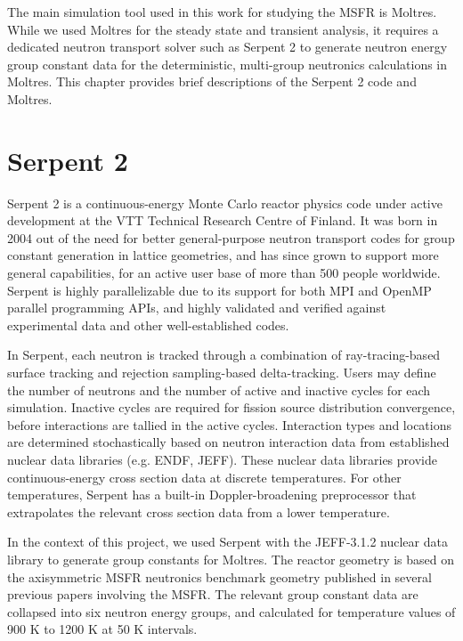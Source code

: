 The main simulation tool used in this work for studying the \gls{MSFR} is
Moltres. While we used Moltres for the steady state and transient analysis, it
requires a dedicated neutron transport solver such as Serpent 2 to generate
neutron energy group constant data for the deterministic, multi-group
neutronics calculations in Moltres. This chapter provides brief descriptions
of the Serpent 2 code and Moltres.

\section{Serpent 2}

Serpent 2 \cite{leppanen_serpent_2014} is a continuous-energy Monte Carlo
reactor physics code under
active development at the VTT Technical Research Centre of Finland. It was
born in 2004 out of the need for better general-purpose neutron transport
codes for group constant generation in lattice geometries, and has since grown
to support more general capabilities, for an active user base of more than 500
people worldwide. Serpent is highly parallelizable due to its support for
both MPI and OpenMP parallel programming APIs, and highly validated and
verified against experimental data and other well-established codes.

In Serpent, each neutron is tracked through a combination of ray-tracing-based
surface tracking and rejection sampling-based delta-tracking. Users may define
the number of neutrons and the number of active and inactive cycles for each
simulation. Inactive cycles are required for fission source distribution
convergence, before interactions are tallied in the active cycles.
Interaction types and locations are
determined stochastically based on neutron interaction data from established
nuclear data libraries (e.g. ENDF, JEFF). These nuclear data libraries provide
continuous-energy cross section data at discrete temperatures. For other
temperatures, Serpent has a built-in Doppler-broadening preprocessor that
extrapolates the relevant cross section data from a lower temperature. 

In the context of this project, we used Serpent with the JEFF-3.1.2 nuclear
data library \cite{oecd/nea_jeff-3.1.2_2014} to generate group constants
for Moltres. The reactor geometry is based on the axisymmetric \gls{MSFR}
neutronics benchmark geometry published in several previous papers involving
the \gls{MSFR}. The relevant group constant data are collapsed into six
neutron energy groups, and calculated for
temperature values of 900 K to 1200 K at 50 K intervals.

